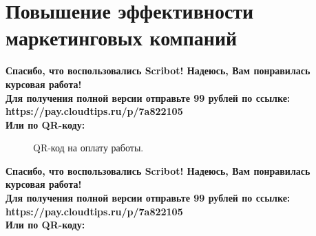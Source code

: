 \documentclass{article}
\begin{document}
\section{Повышение эффективности маркетинговых компаний}
\begin{center}
    \textbf{
        Спасибо, что воспользовались Scribot! Надеюсь, Вам понравилась курсовая работа!\\
        Для получения полной версии отправьте 99 рублей по ссылке:\\
        https://pay.cloudtips.ru/p/7a822105\\
        Или по QR-коду:\\
    }
\end{center}
\begin{figure}[h]
    \caption{QR-код на оплату работы.}
    \label{ris:image}
\end{figure}
\newpage
\begin{center}
    \textbf{
        Спасибо, что воспользовались Scribot! Надеюсь, Вам понравилась курсовая работа!\\
        Для получения полной версии отправьте 99 рублей по ссылке:\\
        https://pay.cloudtips.ru/p/7a822105\\
        Или по QR-коду:\\
    }
\end{center}
\end{document}
